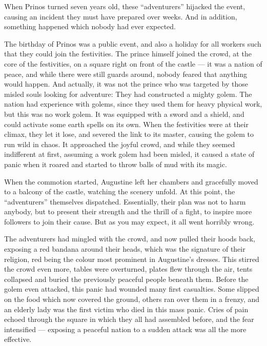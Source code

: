 When Prinos turned seven years old, these \enquote{adventurers} hijacked the event, causing an incident they must have prepared over weeks. And in addition, something happened which nobody had ever expected.

The birthday of Prinos was a public event, and also a holiday for all workers such that they could join the festivities. The prince himself joined the crowd, at the core of the festivities, on a square right on front of the castle --- it was a nation of peace, and while there were still guards around, nobody feared that anything would happen. And actually, it was not the prince who was targeted by those misled souls looking for adventure: They had constructed a mighty golem. The nation had experience with golems, since they used them for heavy physical work, but this was no work golem. It was equipped with a sword and a shield, and could activate some earth spells on its own. When the festivities were at their climax, they let it lose, and severed the link to its master, causing the golem to run wild in chaos. It approached the joyful crowd, and while they seemed indifferent at first, assuming a work golem had been misled, it caused a state of panic when it roared and started to throw balls of mud with its magic.

When the commotion started, Augustine left her chambers and gracefully moved to a balcony of the castle, watching the scenery unfold. At this point, the \enquote{adventurers} themselves dispatched. Essentially, their plan was not to harm anybody, but to present their strength and the thrill of a fight, to inspire more followers to join their cause. But as you may expect, it all went horribly wrong.

The adventurers had mingled with the crowd, and now pulled their hoods back, exposing a red bandana around their heads, which was the signature of their religion, red being the colour most prominent in Augustine's dresses. This stirred the crowd even more, tables were overturned, plates flew through the air, tents collapsed and buried the previously peaceful people beneath them. Before the golem even attacked, this panic had wounded many first casualties. Some slipped on the food which now covered the ground, others ran over them in a frenzy, and an elderly lady was the first victim who died in this mass panic. Cries of pain echoed through the square in which they all had assembled before, and the fear intensified --- exposing a peaceful nation to a sudden attack was all the more effective.

